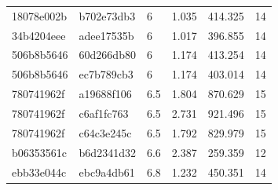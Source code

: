 \documentclass[11pt]{article}
\begin{document}
\begin{table}[htbp]
{\begin{tabular}{l|l|l|r|r|r}
18078e002b & b702e73db3 & 6                & 1.035            & 414.325               & 14           \\
34b4204eee & adee17535b & 6                & 1.017            & 396.855               & 14           \\
506b8b5646 & 60d266db80 & 6                & 1.174            & 413.254               & 14           \\
506b8b5646 & ec7b789cb3 & 6                & 1.174            & 403.014               & 14           \\
780741962f & a19688f106 & 6.5              & 1.804            & 870.629               & 15           \\
780741962f & c6af1fc763 & 6.5              & 2.731            & 921.496               & 15           \\
780741962f & c64c3e245c & 6.5              & 1.792            & 829.979               & 15           \\
b06353561c & b6d2341d32 & 6.6              & 2.387            & 259.359               & 12           \\
ebb33e044c & ebc9a4db61 & 6.8              & 1.232            & 450.351               & 14           \end{tabular}
}
\end{table}
\end{document}
